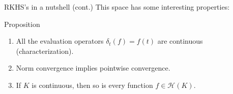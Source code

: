 \documentclass[9pt, english, professionalfonts]{beamer}
\newcommand\maroon[1]{\color{mLightBrown}#1\color{mDarkTeal}}
\newcommand{\Hcal} {\ensuremath\mathcal{H}}
\newcommand\dotprod[2]{\left\langle #1, #2 \right\rangle}
\begin{document}
\begin{frame}{RKHS's in a nutshell (cont.)}
  This space has some interesting properties:

  \vspace{1em}

  \begin{block}{Proposition}
    \begin{enumerate}
      \item All the evaluation operators \(\delta_t(f)=f(t)\) are continuous \maroon{(characterization)}.
      \item Norm convergence implies pointwise convergence.
      \item If \(K\) is continuous, then so is every function \(f\in\mathcal H(K)\).
    \end{enumerate}
  \end{block}
\end{frame}


%
%
%
\end{document}
